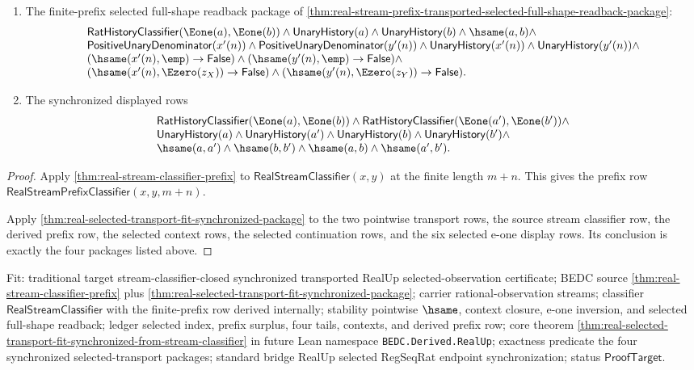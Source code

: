 \begin{theorem}
\begin{enumerate}
$$\begin{array}{l}
\hsame(a,a')\land
\hsame(b,b')\land
\hsame(a,b)\land
\hsame(a',b').
\end{array}
$$
\item The finite-prefix selected full-shape readback package of
\autoref{thm:real-stream-prefix-transported-selected-full-shape-readback-package}:
$$
\begin{array}{l}
\mathsf{RatHistoryClassifier}(\Eone(a),\Eone(b))\land
\mathsf{UnaryHistory}(a)\land \mathsf{UnaryHistory}(b)\land \hsame(a,b)\land\\
\mathsf{PositiveUnaryDenominator}(x'(n))\land
\mathsf{PositiveUnaryDenominator}(y'(n))\land
\mathsf{UnaryHistory}(x'(n))\land
\mathsf{UnaryHistory}(y'(n))\land\\
(\hsame(x'(n),\emp)\to\mathsf{False})\land
(\hsame(y'(n),\emp)\to\mathsf{False})\land\\
(\hsame(x'(n),\Ezero(z_X))\to\mathsf{False})\land
(\hsame(y'(n),\Ezero(z_Y))\to\mathsf{False}).
\end{array}
$$
\item The synchronized displayed rows
$$
\begin{array}{l}
\mathsf{RatHistoryClassifier}(\Eone(a),\Eone(b))\land
\mathsf{RatHistoryClassifier}(\Eone(a'),\Eone(b'))\land\\
\mathsf{UnaryHistory}(a)\land
\mathsf{UnaryHistory}(a')\land
\mathsf{UnaryHistory}(b)\land
\mathsf{UnaryHistory}(b')\land\\
\hsame(a,a')\land
\hsame(b,b')\land
\hsame(a,b)\land
\hsame(a',b').
\end{array}
$$
\end{enumerate}
\end{theorem}
\begin{proof}
Apply \autoref{thm:real-stream-classifier-prefix} to
$\mathsf{RealStreamClassifier}(x,y)$ at the finite length $m+n$. This gives the
prefix row $\mathsf{RealStreamPrefixClassifier}(x,y,m+n)$.

Apply \autoref{thm:real-selected-transport-fit-synchronized-package} to the two
pointwise transport rows, the source stream classifier row, the derived prefix
row, the selected context rows, the selected continuation rows, and the six
selected e-one display rows. Its conclusion is exactly the four packages listed
above.
\end{proof}

Fit: traditional target stream-classifier-closed synchronized transported
RealUp selected-observation certificate; BEDC source
\autoref{thm:real-stream-classifier-prefix} plus
\autoref{thm:real-selected-transport-fit-synchronized-package}; carrier
rational-observation streams; classifier $\mathsf{RealStreamClassifier}$ with
the finite-prefix row derived internally; stability pointwise $\hsame$,
context closure, e-one inversion, and selected full-shape readback; ledger
selected index, prefix surplus, four tails, contexts, and derived prefix row;
core theorem
\autoref{thm:real-selected-transport-fit-synchronized-from-stream-classifier}
in future Lean namespace \texttt{BEDC.Derived.RealUp}; exactness predicate the
four synchronized selected-transport packages; standard bridge RealUp selected
RegSeqRat endpoint synchronization; status $\mathsf{ProofTarget}$.
